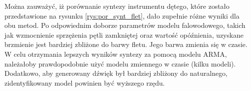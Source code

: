 Można zauważyć, iż porównanie syntezy instrumentu dętego, które zostało przedstawione na rysunku \ref{rys:por_synt_flet}, dało zupełnie różne wyniki dla obu metod. Po odpowiednim doborze parametrów modelu falowodowego, takich jak wzmocnienie sprzężenia pętli zamkniętej oraz wartość opóźnienia, uzyskane brzmienie jest bardziej zbliżone do barwy fletu. Jego barwa zmienia się w czasie. W celu otrzymania lepszych wyników syntezy za pomocą modelu ARMA, należałoby prawdopodobnie użyć modelu zmiennego w czasie (kilku modeli). Dodatkowo, aby generowany dźwięk był bardziej zbliżony do naturalnego, zidentyfikowany model powinien być wyższego rzędu.
